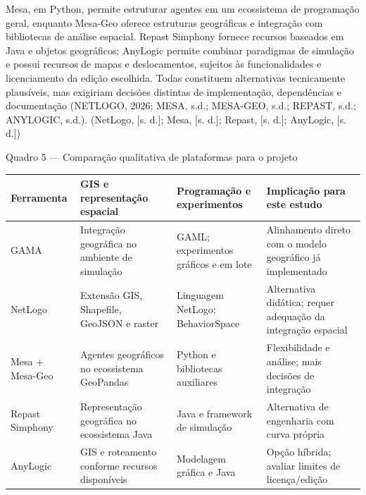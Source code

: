 Mesa, em Python, permite estruturar agentes em um ecossistema de
programação geral, enquanto Mesa-Geo oferece estruturas geográficas e
integração com bibliotecas de análise espacial. Repast Simphony fornece
recursos baseados em Java e objetos geográficos; AnyLogic permite
combinar paradigmas de simulação e possui recursos de mapas e
deslocamentos, sujeitos às funcionalidades e licenciamento da edição
escolhida. Todas constituem alternativas tecnicamente plausíveis, mas
exigiriam decisões distintas de implementação, dependências e
documentação (NETLOGO, 2026; MESA, s.d.; MESA-GEO, s.d.; REPAST, s.d.;
ANYLOGIC, s.d.). (NetLogo, {[}s. d.{]}; Mesa, {[}s. d.{]}; Repast, {[}s.
d.{]}; AnyLogic, {[}s. d.{]})

Quadro 5 --- Comparação qualitativa de plataformas para o projeto

\begin{longtable}[]{@{}
  >{\raggedright\arraybackslash}p{}
  >{\raggedright\arraybackslash}p{}
  >{\raggedright\arraybackslash}p{}
  >{\raggedright\arraybackslash}p{}@{}}
\toprule\noalign{}
\begin{minipage}[b]{\linewidth}\raggedright
\textbf{Ferramenta}
\end{minipage} & \begin{minipage}[b]{\linewidth}\raggedright
\textbf{GIS e representação espacial}
\end{minipage} & \begin{minipage}[b]{\linewidth}\raggedright
\textbf{Programação e experimentos}
\end{minipage} & \begin{minipage}[b]{\linewidth}\raggedright
\textbf{Implicação para este estudo}
\end{minipage} \\
\midrule\noalign{}
\endhead
\bottomrule\noalign{}
\endlastfoot
GAMA & Integração geográfica no ambiente de simulação & GAML;
experimentos gráficos e em lote & Alinhamento direto com o modelo
geográfico já implementado \\
NetLogo & Extensão GIS, Shapefile, GeoJSON e raster & Linguagem NetLogo;
BehaviorSpace & Alternativa didática; requer adequação da integração
espacial \\
Mesa + Mesa-Geo & Agentes geográficos no ecossistema GeoPandas & Python
e bibliotecas auxiliares & Flexibilidade e análise; mais decisões de
integração \\
Repast Simphony & Representação geográfica no ecossistema Java & Java e
framework de simulação & Alternativa de engenharia com curva própria \\
AnyLogic & GIS e roteamento conforme recursos disponíveis & Modelagem
gráfica e Java & Opção híbrida; avaliar limites de licença/edição \\
\end{longtable}

